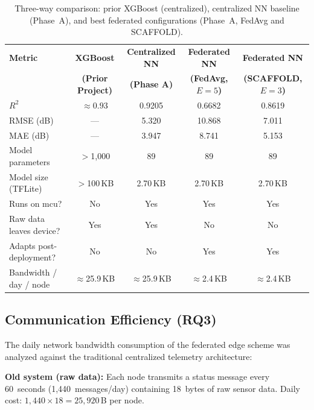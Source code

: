 \begin{table}[H]
  \centering
  \begin{tabular}{lcccc}
    \toprule
    \textbf{Metric} &
    \textbf{XGBoost} & \textbf{Centralized NN} & \textbf{Federated NN} & \textbf{Federated NN} \\
    & \textbf{(Prior Project)} & \textbf{(Phase A)} & \textbf{(FedAvg, $E=5$)} & \textbf{(SCAFFOLD, $E=3$)} \\
    \midrule
    $R^2$                   & $\approx 0.93$ & 0.9205           & 0.6682           & 0.8619           \\
    RMSE (dB)               & ---            & 5.320            & 10.868           & 7.011            \\
    MAE (dB)                & ---            & 3.947            & 8.741            & 5.153            \\
    Model parameters        & $>$1{,}000     & 89               & 89               & 89               \\
    Model size (TFLite)     & $>$100\,KB     & 2.70\,KB         & 2.70\,KB         & 2.70\,KB         \\
    Runs on \gls{mcu}?      & No             & Yes              & Yes              & Yes              \\
    Raw data leaves device? & Yes            & Yes              & No               & No               \\
    Adapts post-deployment? & No             & No               & Yes              & Yes              \\
    Bandwidth / day / node  & $\approx$25.9\,KB & $\approx$25.9\,KB & $\approx$2.4\,KB & $\approx$2.4\,KB \\
    \bottomrule
  \end{tabular}
  \caption{Three-way comparison: prior XGBoost (centralized), centralized NN baseline (Phase~A), and best federated configurations (Phase~A, FedAvg and SCAFFOLD).}
  \label{tab:three-way}
\end{table}

\subsection{Communication Efficiency (RQ3)}
\label{sec:comm-efficiency}
The daily network bandwidth consumption of the federated edge scheme was analyzed against the traditional centralized telemetry architecture:

\noindent\textbf{Old system (raw data):} Each node transmits a status message every 60~seconds (1{,}440~messages/day) containing 18~bytes of raw sensor data. Daily cost: $1{,}440 \times 18 = 25{,}920$\,B per node.

